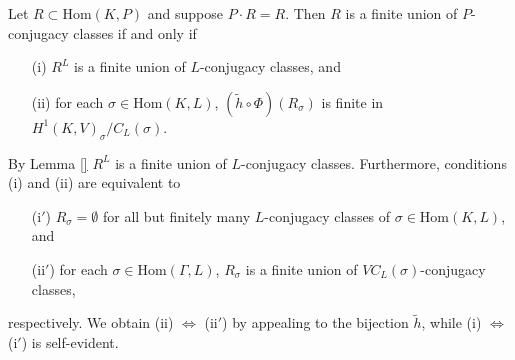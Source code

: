 \begin{theorem}\label{r:finite_p} Let $R \subset \mathrm{Hom}(K, P)$ and suppose $P \cdot R = R$. Then $R$ is a finite union of $P$-conjugacy classes if and only if
	\begin{itemize}
		\item[(i)] $R^L$ is a finite union of $L$-conjugacy classes, and
		\item[(ii)] for each $\sigma \in \mathrm{Hom}(K, L)$, $(\widetilde{h} \circ \Phi)(R_\sigma)$ is finite in $H^1(K, V)_\sigma/C_L(\sigma)$.
	\end{itemize}
\end{theorem}
\begin{remark} By Lemma \ref{} $R^L$ is a finite union of $L$-conjugacy classes. Furthermore, conditions (i) and (ii) are equivalent to 
	\begin{itemize}
		\item[(i$'$)] $R_\sigma = \emptyset$ for all but finitely many $L$-conjugacy classes of $\sigma \in \mathrm{Hom}(K, L)$, and
		\item[(ii$'$)] for each $\sigma \in \mathrm{Hom}(\Gamma, L)$, $R_\sigma$ is a finite union of $VC_L(\sigma)$-conjugacy classes,
	\end{itemize}
	respectively. We obtain (ii) $\Leftrightarrow$ (ii$'$) by appealing to the bijection $\widetilde{h}$, while (i) $\Leftrightarrow$ (i$'$) is self-evident.
\end{remark}
